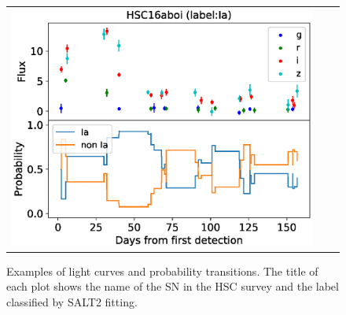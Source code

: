 \documentclass[useamsfonts]{pasj01}
\begin{document}
\begin{figure}[htbp]
\begin{tabular}{ccc}
\begin{minipage}{0.33\hsize}
\begin{center}
            \end{center}
        \end{minipage}
        \begin{minipage}{0.33\hsize}
            \begin{center}
                \includegraphics[width=\columnwidth]{figures/lcp_aboi.eps}
            \end{center}
        \end{minipage}
    \end{tabular}
    \vspace{3mm}
    \caption{%
    Examples of light curves and probability transitions. The title of each plot shows the name of the SN in the HSC survey and the label classified by SALT2 fitting.
    }%
    \label{fig:lcps}
\end{figure}
%
\end{document}

